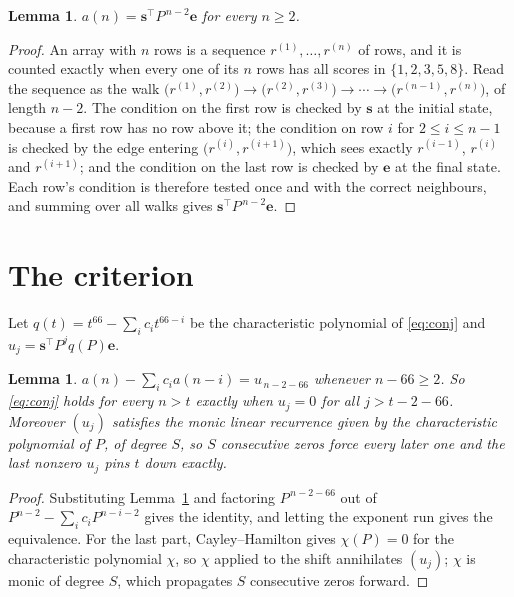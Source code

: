 \documentclass[11pt,a4paper]{article}
\theoremstyle{plain}
\newtheorem{lemma}[theorem]{Lemma}
\theoremstyle{definition}
\begin{document}
\begin{lemma}\label{lem:walk}
$a(n)=\mathbf{s}^{\!\top}P^{\,n-2}\mathbf{e}$ for every $n\ge2$.
\end{lemma}

\begin{proof}
An array with $n$ rows is a sequence $r^{(1)},\dots,r^{(n)}$ of rows, and it is counted
exactly when every one of its $n$ rows has all scores in $\{1,2,3,5,8\}$. Read the sequence as the
walk $\bigl(r^{(1)},r^{(2)}\bigr)\to\bigl(r^{(2)},r^{(3)}\bigr)\to\cdots\to
\bigl(r^{(n-1)},r^{(n)}\bigr)$, of length $n-2$. The condition on the first row is
checked by $\mathbf{s}$ at the initial state, because a first row has no row above it; the
condition on row $i$ for $2\le i\le n-1$ is checked by the edge entering
$\bigl(r^{(i)},r^{(i+1)}\bigr)$, which sees exactly $r^{(i-1)}$, $r^{(i)}$ and
$r^{(i+1)}$; and the condition on the last row is checked by $\mathbf{e}$ at the final
state. Each row's condition is therefore tested once and with the correct neighbours, and
summing over all walks gives $\mathbf{s}^{\!\top}P^{\,n-2}\mathbf{e}$.
\end{proof}

\section{The criterion}

Let $q(t)=t^{66}-\sum_i c_i t^{66-i}$ be the characteristic polynomial of
\eqref{eq:conj} and $u_j=\mathbf{s}^{\!\top}P^{j}q(P)\mathbf{e}$.

\begin{lemma}\label{lem:crit}
$a(n)-\sum_i c_i a(n-i)=u_{\,n-2-66}$ whenever $n-66\ge2$. So \eqref{eq:conj}
holds for every $n>t$ exactly when $u_j=0$ for all $j>t-2-66$. Moreover $(u_j)$
satisfies the monic linear recurrence given by the characteristic polynomial of $P$, of
degree $S$, so $S$ consecutive zeros force every later one and the last nonzero $u_j$ pins
$t$ down exactly.
\end{lemma}

\begin{proof}
Substituting Lemma~\ref{lem:walk} and factoring $P^{\,n-2-66}$ out of
$P^{n-2}-\sum_i c_i P^{n-i-2}$ gives the identity, and letting the exponent run gives the
equivalence. For the last part, Cayley--Hamilton gives $\chi(P)=0$ for the characteristic
polynomial $\chi$, so $\chi$ applied to the shift annihilates $(u_j)$; $\chi$ is monic of
degree $S$, which propagates $S$ consecutive zeros forward.
\end{proof}
\end{document}

